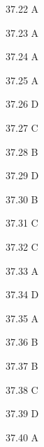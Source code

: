 \begin{Solution}{37.{22}}
A
\end{Solution}
\begin{Solution}{37.{23}}
A
\end{Solution}
\begin{Solution}{37.{24}}
A
\end{Solution}
\begin{Solution}{37.{25}}
A
\end{Solution}
\begin{Solution}{37.{26}}
D
\end{Solution}
\begin{Solution}{37.{27}}
C
\end{Solution}
\begin{Solution}{37.{28}}
B
\end{Solution}
\begin{Solution}{37.{29}}
D
\end{Solution}
\begin{Solution}{37.{30}}
B
\end{Solution}
\begin{Solution}{37.{31}}
C
\end{Solution}
\begin{Solution}{37.{32}}
C
\end{Solution}
\begin{Solution}{37.{33}}
A
\end{Solution}
\begin{Solution}{37.{34}}
D
\end{Solution}
\begin{Solution}{37.{35}}
A
\end{Solution}
\begin{Solution}{37.{36}}
B
\end{Solution}
\begin{Solution}{37.{37}}
B
\end{Solution}
\begin{Solution}{37.{38}}
C
\end{Solution}
\begin{Solution}{37.{39}}
D
\end{Solution}
\begin{Solution}{37.{40}}
A
\end{Solution}
